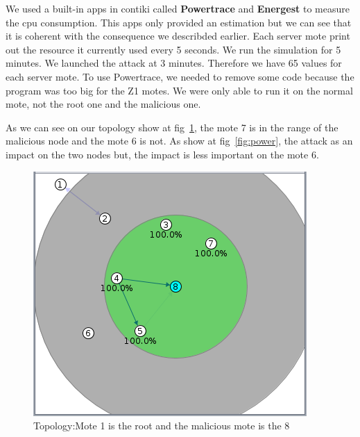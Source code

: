 \documentclass[11pt]{report}
\begin{document}
We used a built-in apps in contiki called \textbf{Powertrace} and
\textbf{Energest} to measure the cpu consumption. This apps only
provided an estimation but we can see that it is coherent with the
consequence we describded earlier. Each server mote print out the
resource it currently used every 5 seconds. We run the simulation for 5
minutes. We launched the attack at 3 minutes. Therefore we have 65
values for each server mote. To use Powertrace, we needed to remove some
code because the program was too big for the Z1 motes. We were only able
to run it on the normal mote, not the root one and the malicious one. 

As we can see on our topology show at fig~\ref{fig:topo}, the mote 7 is
in the range of the malicious node and the mote
6 is not. As show at fig~\ref{fig:power}, the attack as an impact on the two nodes but, the impact is less important
on the mote 6.


\begin{figure}[ht!]
    \centering
    \includegraphics[scale=0.55]{img/simulation_measurement}
    \caption{Topology:Mote 1 is the root and the malicious mote is the 8}
    \label{fig:topo}
\end{figure}
\end{document}
